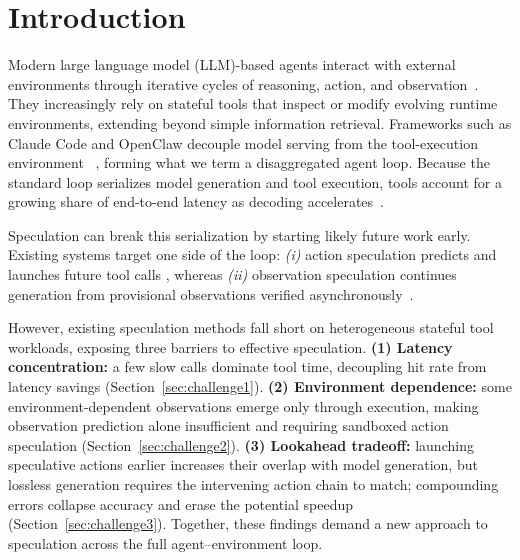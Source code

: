 \section{Introduction}
Modern large language model (LLM)-based agents interact with external environments through iterative cycles of reasoning, action, and observation~\citep{yao2023react}. They increasingly rely on stateful tools that inspect or modify evolving runtime environments, extending beyond simple
information retrieval. 
Frameworks such as Claude Code and OpenClaw decouple
model serving from the tool-execution environment
~\citep{anthropic2026claudecode,openclaw2026runtime}, forming what we term a disaggregated agent loop. Because the standard loop serializes model generation
and tool execution, tools account for a growing share of end-to-end latency as decoding accelerates~\citep{tilert2026, artificialanalysis_anthropic, artificialanalysis_openai, groq2024specdec, cerebras2025k2think}.

Speculation can break this serialization by starting likely future work early.
Existing systems target one side of the loop: \textit{(i)} action speculation
predicts and launches future tool calls
\citep{ye2025speculative,sui2026parallelizing,spectoolcalls2025,bpaste2026,spork2026},
whereas \textit{(ii)} observation speculation continues generation from
provisional observations verified asynchronously~\citep{saberi2026spechop}.

However, existing speculation methods fall short on heterogeneous stateful tool workloads, exposing three barriers to effective speculation.
\textbf{(1) Latency concentration:} a few slow calls dominate tool time, decoupling hit rate from latency savings (Section~\ref{sec:challenge1}).
\textbf{(2) Environment dependence:} some environment-dependent observations emerge only through execution, making observation prediction alone insufficient and requiring sandboxed action speculation (Section~\ref{sec:challenge2}).
\textbf{(3) Lookahead tradeoff:} launching speculative actions earlier increases their overlap with model generation, but lossless generation requires the intervening action chain to match;
compounding errors collapse accuracy and erase the potential speedup
(Section~\ref{sec:challenge3}). 
Together, these findings demand a new approach
to speculation across the full agent--environment loop.

